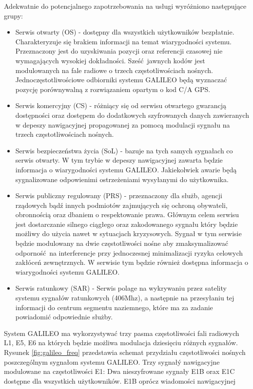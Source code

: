 Adekwatnie do potencjalnego zapotrzebowania na usługi wyróżniono następujące grupy:
\begin{itemize}
\item Serwis otwarty (OS) - dostępny dla wszystkich użytkowników bezpłatnie. Charakteryzuje się brakiem informacji na temat wiarygodności systemu.
Przeznaczony jest do uzyskiwania pozycji oraz referencji czasowej nie wymagających wysokiej dokładności. Sześć jawnych kodów jest modulowanych na fale radiowe o 
trzech częstotliwościach nośnych. Jednoczęstotliwościowe odbiorniki systemu GALILEO będą wyznaczać pozycję porównywalną z rozwiązaniem opartym o kod C/A GPS.
\item Serwis komercyjny (CS) - różniący się od serwisu otwartego gwarancją dostępności oraz dostępem do dodatkowych szyfrowanych danych zawieranych w depeszy nawigacyjnej 
propagowanej za pomocą modulacji sygnału na trzech częstotliwościach nośnych. 
\item Serwis bezpieczeństwa życia (SoL) - bazuje na tych samych sygnałach co serwis otwarty. W tym trybie w depeszy nawigacyjnej zawarta będzie informacja o wiarygodności 
systemu GALILEO. Jakiekolwiek awarie będą sygnalizowane odpowienimi ostrzeżeniami wysyłanymi do użytkownika.
\item Serwis publiczny regulowany (PRS) - przeznaczony dla służb, agencji rządowych bądź innych podmiotów zajmujących się ochroną obywateli, obronnością oraz dbaniem o
respektowanie prawa. Głównym celem serwisu jest dostarczanie silnego ciągłego oraz zakodowanego sygnału który będzie możliwy do użycia nawet w sytuacjach kryzysowych.
Sygnał w tym serwisie będzie modulowany na dwie częstotliwości nośne aby zmaksymalizować odporność na interferencje przy jednoczesnej minimalizacji ryzyka celowych
zakłóceń zewnętrznych. W serwisie tym będzie również dostępna informacja o wiarygodności systemu GALILEO.
\item Serwis ratunkowy (SAR) - Serwis polage na wykrywaniu przez satelity systemu sygnałów ratunkowych (406Mhz), a następnie na przesyłaniu tej informacji do 
centrum segmentu naziemnego, które ma za zadanie powiadomić odpowiednie służby.
\end{itemize}
\indent System GALILEO ma wykorzystywać trzy pasma częstotliwości fali radiowych L1, E5, E6 na których będzie możliwa modulacja dziesięciu różnych sygnałów.
Rysunek \ref{fig:galileo_freq} przedstawia schemat przydziału częstotliwości nośnych poszczególnym sygnałom systemu GALILEO.
Trzy sygnałý nawigacyjne modulowane na częstotliwości E1: Dwa nieszyfrowane sygnały E1B orax E1C dostępne dla wszystkich użytkowników. E1B oprócz wiadomości nawigacyjnej 
